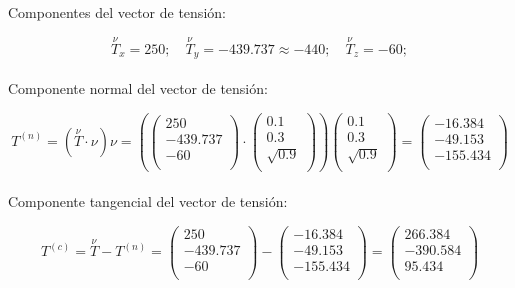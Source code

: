 \documentclass[a4paper,12pt,twoside,final,spanish]{article}
\begin{document}
Componentes del vector de tensión:

\[
\stackrel \nu T_{x}=250;\quad
\stackrel \nu T_{y}=-439.737\approx-440;\quad
\stackrel \nu T_{z}=-60;
\]\\

Componente normal del vector de tensión:

\[
T^{(n)}=(\stackrel \nu T\cdot\nu)\nu=
\left(\left(\begin{matrix}
250 \\
-439.737 \\
-60 \\
\end{matrix}\right)\cdot
\left(\begin{matrix}
0.1 \\
0.3 \\
\sqrt{0.9} \\
\end{matrix}\right)\right)
\left(\begin{matrix}
0.1 \\
0.3 \\
\sqrt{0.9} \\
\end{matrix}\right)=
\left(\begin{matrix}
-16.384 \\
-49.153 \\
-155.434 \\
\end{matrix}\right)
\]\\

Componente tangencial del vector de tensión:

\[
T^{(c)}=\stackrel \nu T-T^{(n)}=
\left(\begin{matrix}
250 \\
-439.737 \\
-60 \\
\end{matrix}\right)-
\left(\begin{matrix}
-16.384 \\
-49.153 \\
-155.434 \\
\end{matrix}\right)=
\left(\begin{matrix}
266.384 \\
-390.584 \\
95.434 \\
\end{matrix}\right)
\]\\
\end{document}
